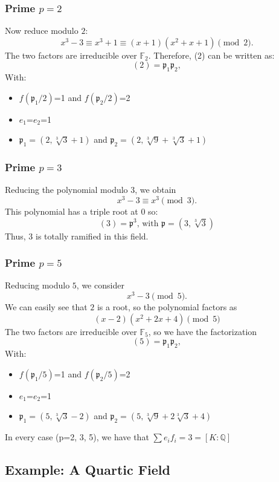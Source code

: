 \subsubsection*{Prime $p = 2$}

Now reduce modulo $2$:
\[
x^3 - 3 \equiv x^3 + 1 \equiv (x+1)(x^2+x+1) \pmod{2}.
\]
The two factors are irreducible over $\mathbb{F}_2$. Therefore, (2) can be written as:
\[
(2) = \mathfrak{p}_1 \mathfrak{p}_2,
\]
With:
\begin{itemize}
    \item $f(\mathfrak{p}_1/2)$=1 and $f(\mathfrak{p}_2/2)$=2
    \item $e_1$=$e_2$=1
    \item $\mathfrak{p}_1=(2,\sqrt[3]{3}+1)$ and $\mathfrak{p}_2=(2,\sqrt[3]{9}+\sqrt[3]{3}+1)$
\end{itemize}
\subsubsection*{Prime $p = 3$}

Reducing the polynomial modulo $3$, we obtain
\[
x^3 - 3 \equiv x^3 \pmod{3}.
\]
This polynomial has a triple root at $0$ so:
\[
(3) = \mathfrak{p}^3 \text{, with }  \mathfrak{p}=(3,\sqrt[3]{3})
\]
Thus, $3$ is totally ramified in this field.
\subsubsection*{Prime $p = 5$}

Reducing modulo $5$, we consider
\[
x^3 - 3 \pmod{5}.
\]
We can easily see that $2$ is a root, so the polynomial factors as
\[
(x-2)(x^2 + 2x + 4) \pmod{5}
\]
The two factors are irreducible over $\mathbb{F}_5$, so we have the factorization
\[
(5) = \mathfrak{p}_1 \mathfrak{p}_2,
\]
With:
\begin{itemize}
    \item $f(\mathfrak{p}_1/5)$=1 and $f(\mathfrak{p}_2/5)$=2
    \item $e_1$=$e_2$=1
    \item $\mathfrak{p}_1=(5,\sqrt[3]{3}-2)$ and $\mathfrak{p}_2=(5,\sqrt[3]{9}+2\sqrt[3]{3}+4)$
\end{itemize}
\[
\]
In every case (p=2, 3, 5), we have that $\sum{e_if_i}=3=[K: \mathbb{Q}]$

\subsection{Example: A Quartic Field}

